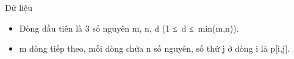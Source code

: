 Dữ liệu
\begin{itemize}
	\item     Dòng đầu tiên là 3 số nguyên m, n, d (1 ≤ d ≤ min(m,n)).   
	\item     m dòng tiếp theo, mỗi dòng chứa n số nguyên, số thứ j ở dòng i là p[i,j].   
\end{itemize}